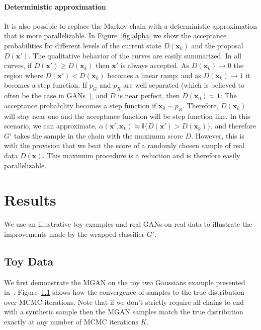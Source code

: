 \documentclass{article}
\renewcommand{\vec}[1]{{\boldsymbol{\mathbf{#1}}}} %
\newcommand{\I}{\mathbb{I}}
\newcommand{\sample}{\sim}
\newcommand{\PG}{{p_G}}
\newcommand{\PR}{{p_R}}
\newcommand{\accept}{\alpha}
\begin{document}
\paragraph{Deterministic approximation}
It is also possible to replace the Markov chain with a deterministic approximation that is more parallelizable.
In Figure~\ref{fig:alpha} we show the acceptance probabilities for different levels of the current state $D(\vec x_k)$ and the proposal $D(\vec x')$.
The qualitative behavior of the curves are easily summarized.
In all curves, if $D(\vec x') \geq D(\vec x_k)$ then $\vec x'$ is always accepted.
As $D(\vec x_k) \rightarrow 0$ the region where $D(\vec x') < D(\vec x_k)$ becomes a linear ramp; and as $D(\vec x_k) \rightarrow 1$ it becomes a step function.
If $\PG$ and $\PR$ are well separated (which is believed to often be the case in GANs~\citep{Arjovsky2017}), and $D$ is near perfect, then $D(\vec x_0) \approx 1$: The acceptance probability becomes a step function if $\vec x_0 \sample \PR$.
Therefore, $D(\vec x_k)$ will stay near one and the acceptance function will be step function like.
In this scenario, we can approximate, $\accept(\vec x', \vec x_k) \approx \I\{D(\vec x') > D(\vec x_k)\}$, and therefore $G'$ takes the sample in the chain with the maximum score $D$.
However, this is with the provision that we beat the score of a randomly chosen sample of real data $D(\vec x)$.
This maximum procedure is a reduction and is therefore easily parallelizable.


\section{Results}

We use an illustrative toy examples and real GANs on real data to illustrate the improvements made by the wrapped classifier $G'$.

\subsection{Toy Data}
We first demonstrate the MGAN on the toy two Gaussians example presented in~\citet{Arjovsky2017}.
Figure~\ref{} shows how the convergence of samples to the true distribution over MCMC iterations.
Note that if we don't strictly require all chains to end with a synthetic sample then the MGAN samples match the true distribution exactly at any number of MCMC iterations $K$.
\end{document}
